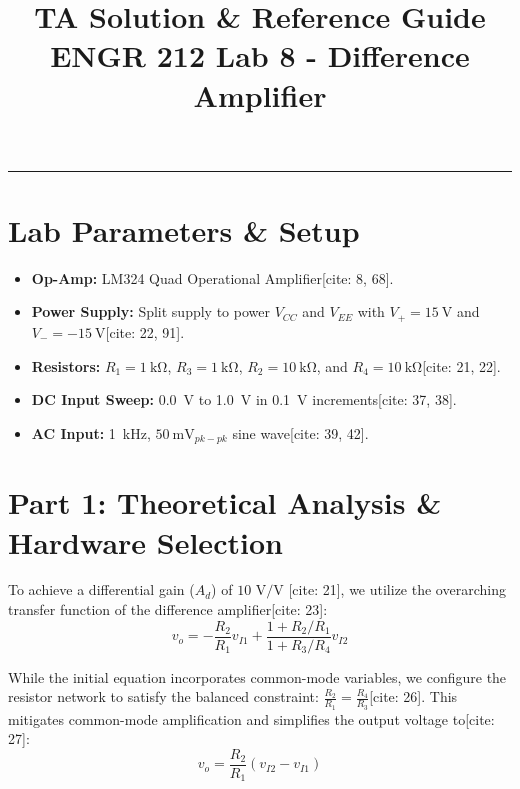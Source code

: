 \documentclass[11pt]{article}
\title{\vspace{-1in}\textbf{TA Solution \& Reference Guide} \\ \Large ENGR 212 Lab 8 - Difference Amplifier}
\author{}
\date{}
\begin{document}
\maketitle
\vspace{-0.5in}
\hrule
\vspace{0.2in}

\section*{Lab Parameters \& Setup}
\begin{itemize}
  \item \textbf{Op-Amp:} LM324 Quad Operational Amplifier[cite: 8, 68].
  \item \textbf{Power Supply:} Split supply to power $V_{CC}$ and $V_{EE}$ with $V_{+} = \SI{15}{\volt}$ and $V_{-} = \SI{-15}{\volt}$[cite: 22, 91].
  \item \textbf{Resistors:} $R_1 = \SI{1}{\kilo\ohm}$, $R_3 = \SI{1}{\kilo\ohm}$, $R_2 = \SI{10}{\kilo\ohm}$, and $R_4 = \SI{10}{\kilo\ohm}$[cite: 21, 22].
  \item \textbf{DC Input Sweep:} \SI{0.0}{\volt} to \SI{1.0}{\volt} in \SI{0.1}{\volt} increments[cite: 37, 38].
  \item \textbf{AC Input:} \SI{1}{\kilo\hertz}, $\SI{50}{\milli\volt}_{pk-pk}$ sine wave[cite: 39, 42].
\end{itemize}

\vspace{0.2in}
\section*{Part 1: Theoretical Analysis \& Hardware Selection}

To achieve a differential gain ($A_d$) of $10\text{ V/V}$ [cite: 21], we utilize the overarching transfer function of the difference amplifier[cite: 23]:
\begin{equation}
  v_o = -\frac{R_2}{R_1}v_{I1} + \frac{1 + R_2/R_1}{1 + R_3/R_4}v_{I2}
\end{equation}

While the initial equation incorporates common-mode variables, we configure the resistor network to satisfy the balanced constraint: $\frac{R_2}{R_1} = \frac{R_4}{R_3}$[cite: 26]. This mitigates common-mode amplification and simplifies the output voltage to[cite: 27]:
\begin{equation}
  v_o = \frac{R_2}{R_1}(v_{I2} - v_{I1})
\end{equation}
\end{document}
